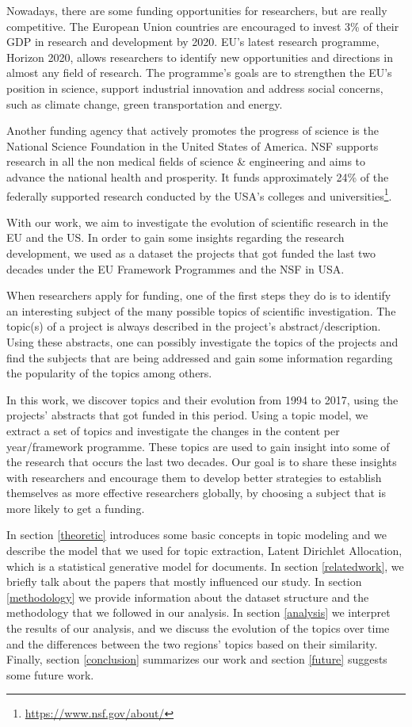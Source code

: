 \documentclass[12pt]{report}
\begin{document}
Nowadays, there are some funding opportunities for researchers, but are 
really competitive. The European Union countries are encouraged to
invest 3\% of their GDP in research and development by 2020. EU's
latest research programme, Horizon 2020, allows researchers to
identify new opportunities and directions in almost any field of
research. The programme's goals are to strengthen the EU's position in
science, support industrial innovation and address social concerns,
such as climate change, green transportation and energy.

Another funding agency that actively promotes the progress of science
is the National Science Foundation in the United States of America.
NSF supports research in all the non medical fields of science \&
engineering and aims to advance the national health and prosperity. It
funds approximately 24\% of the federally supported research
conducted by the USA's colleges and universities\footnote{\url{https://www.nsf.gov/about/}}.

With our work, we aim to investigate the evolution of scientific
research in the EU and the US. In order to gain some insights  regarding
the research development, we used as a dataset the projects that got funded 
the last two decades under the EU Framework Programmes and the NSF in USA.

When researchers apply for funding, one of the first steps they do is
to identify an interesting subject of the many possible topics of
scientific investigation. The topic(s) of a project is always
described in the project's abstract/description. Using these abstracts, 
one can possibly investigate the topics of the projects and find the 
subjects that are being addressed and gain some information regarding 
the popularity of the topics among others.

In this work, we discover topics and their evolution from 1994 to
2017, using the projects' abstracts that got funded in this
period. Using a topic model, we extract a set of topics and
investigate the changes in the content per year/framework programme.
These topics are used to gain insight into some of the research that
occurs the last two decades. Our goal is to share these insights with
researchers and encourage them to develop better strategies to
establish themselves as more effective researchers globally, by
choosing a subject that is more likely to get a funding.

In section \ref{theoretic} introduces some basic concepts
in topic modeling and we describe the model that we used for topic
extraction, Latent Dirichlet Allocation, which is a statistical
generative model for documents. In section \ref{relatedwork}, 
we briefly talk about the papers that mostly influenced our study. 
In section \ref{methodology} we provide information
about the dataset structure and the methodology that we followed in
our analysis. In section \ref{analysis} we interpret the results of 
our analysis, and we discuss the evolution of the topics over time and the
differences between the two regions' topics based on their similarity.
Finally, section \ref{conclusion} summarizes our work and section 
\ref{future} suggests some future work.
\end{document}
